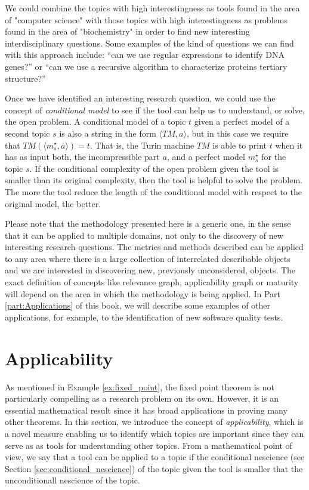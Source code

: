 \begin{example}
We could combine the topics with high interestingness as tools found in the area of "computer science" with those topics with high interestingness as problems found in the area of "biochemistry" in order to find new interesting interdisciplinary questions. Some examples of the kind of questions we can find with this approach include: “can we use regular expressions to identify DNA genes?” or “can we use a recursive algorithm to characterize proteins tertiary structure?”
\end{example}

Once we have identified an interesting research question, we could use the concept of \emph{conditional model} to see if the tool can help us to understand, or solve, the open problem. A conditional model of a topic $t$ given a perfect model of a second topic $s$ is also a string in the form $\langle TM,a \rangle$, but in this case we require that $TM \left(\langle m_s^\star, a \rangle \right) = t$. That is, the Turin machine $TM$ is able to print $t$ when it has as input both, the incompressible part $a$, and a perfect model $m_s^\star$ for the topic $s$. If the conditional complexity of the open problem given the tool is smaller than its original complexity, then the tool is helpful to solve the problem. The more the tool reduce the length of the conditional model with respect to the original model, the better.

Please note that the methodology presented here is a generic one, in the sense that it can be applied to multiple domains, not only to the discovery of new interesting research questions. The metrics and methods described can be applied to any area where there is a large collection of interrelated describable objects and we are interested in discovering new, previously unconsidered, objects. The exact definition of concepts like relevance graph, applicability graph or maturity will depend on the area in which the methodology is being applied. In Part \ref{part:Applications} of this book, we will describe some examples of other applications, for example, to the identification of new software quality tests.

%
%

\section{Applicability}
\label{sec:applicability}

As mentioned in Example \ref{ex:fixed_point}, the fixed point theorem is not particularly compelling as a research problem on its own. However, it is an essential mathematical result since it has broad applications in proving many other theorems. In this section, we introduce the concept of \emph{applicability}, which is a novel measure enabling us to identify which topics are important since they can serve as as tools for understanding other topics. From a mathematical point of view, we say that a tool can be applied to a topic if the conditional nescience (see Section \ref{sec:conditional_nescience}) of the topic given the tool is smaller that the unconditionall nescience of the topic.

